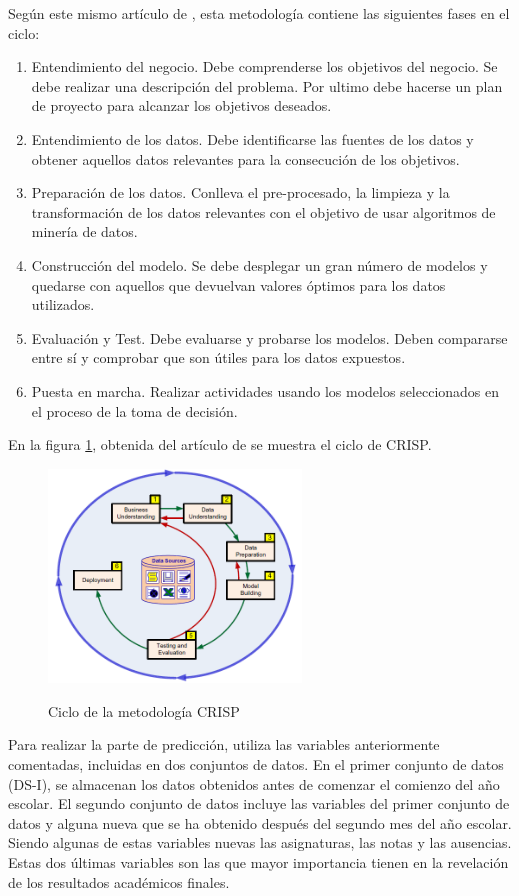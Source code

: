 Según este mismo artículo de , esta metodología contiene las siguientes fases en el ciclo:
\begin{enumerate}
	\item Entendimiento del negocio. Debe comprenderse los objetivos del negocio. Se debe realizar una descripción del problema. Por ultimo debe hacerse un plan de proyecto para alcanzar los objetivos deseados.
	\item Entendimiento de los datos. Debe identificarse las fuentes de los datos y obtener aquellos datos relevantes para la consecución de los objetivos.
	\item Preparación de los datos. Conlleva el pre-procesado, la limpieza y la transformación de los datos relevantes con el objetivo de usar algoritmos de minería de datos.
	\item Construcción del modelo. Se debe desplegar un gran número de modelos y quedarse con aquellos que devuelvan valores óptimos para los datos utilizados.
	\item Evaluación y Test. Debe evaluarse y probarse los modelos. Deben compararse entre sí y comprobar que son útiles para los datos expuestos.
	\item Puesta en marcha. Realizar actividades usando los modelos seleccionados en el proceso de la toma de decisión.
\end{enumerate}

En la figura \ref{fig:cicloCrisp}, obtenida del artículo de  se muestra el ciclo de CRISP.

\begin{figure}[htb]
	\centering
	\caption{Ciclo de la metodología CRISP}
	\includegraphics[width=0.6\textwidth]{recursos/CRISPCiclo}
	\label{fig:cicloCrisp}
\end{figure}


Para realizar la parte de predicción, utiliza las variables anteriormente comentadas, incluidas en dos conjuntos de datos. En el primer conjunto de datos (DS-I), se almacenan los datos obtenidos antes de comenzar el comienzo del año escolar. El segundo conjunto de datos incluye las variables del primer conjunto de datos y alguna nueva que se ha obtenido después del segundo mes del año escolar. Siendo algunas de estas variables nuevas las asignaturas, las notas y las ausencias. Estas dos últimas variables son las que mayor importancia tienen en la revelación de los resultados académicos finales.

